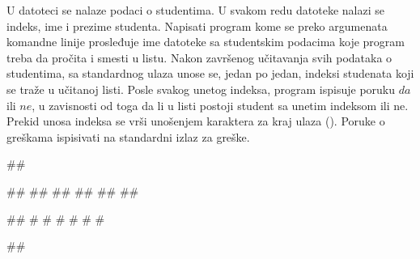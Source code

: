 \begin{Answer}[ref=4_03]
\end{Answer}

\begin{Exercise}[label=4_04]
U datoteci se nalaze podaci o studentima. U svakom redu datoteke nalazi se indeks, ime i prezime studenta. 
Napisati program kome se preko argumenata komandne linije prosleđuje ime datoteke sa studentskim podacima koje program treba da pročita i smesti u listu. 
Nakon završenog učitavanja svih podataka o studentima, sa standardnog ulaza unose se, jedan po jedan, indeksi studenata koji se traže u učitanoj listi. 
Posle svakog unetog indeksa, program ispisuje poruku $da$ ili $ne$, u zavisnosti od toga da li u listi postoji student sa unetim indeksom ili ne. 
Prekid unosa indeksa se vrši unošenjem karaktera za kraj ulaza (). Poruke o greškama ispisivati na standardni izlaz za greške.



\begin{miditest}
\begin{upotreba}{1}
##

##
##
##
##
##
##

#\naslovInt#           
# #
# #
# #
\end{upotreba}
\end{miditest}
\begin{miditest}
\begin{upotreba}{2}
##


\end{upotreba}
\end{miditest}
\end{Exercise}
